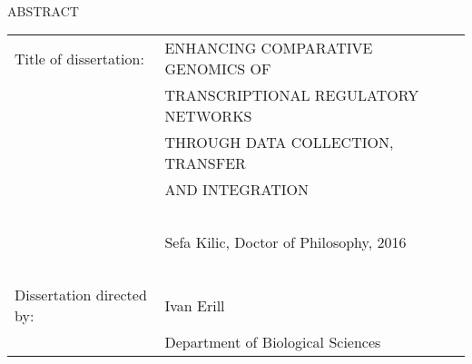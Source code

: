 
\hbox{\ }

\renewcommand{\baselinestretch}{1}
\small \normalsize

\begin{center}
\large{{ABSTRACT}}

\vspace{3em}

\end{center}
\hspace{-.15in}
\begin{tabular}{ll}
Title of dissertation:    & {ENHANCING COMPARATIVE GENOMICS OF}\\
&				      {TRANSCRIPTIONAL REGULATORY NETWORKS} \\
&				      {THROUGH DATA COLLECTION, TRANSFER}\\
&                     {AND INTEGRATION} \\
\ \\
&                          {Sefa Kilic, Doctor of Philosophy, 2016} \\
\ \\
Dissertation directed by: & {Ivan Erill} \\
&  				{Department of Biological Sciences } \\
\end{tabular}

\vspace{3em}

\renewcommand{\baselinestretch}{2}
\large \normalsize

